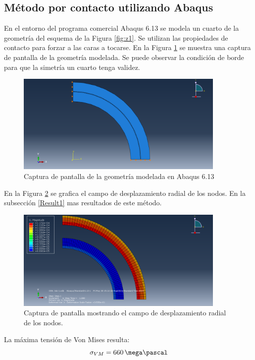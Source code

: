\subsection{M\'etodo por contacto utilizando Abaqus}
En el entorno del programa comercial Abaqus 6.13 se modela un cuarto de la geometr\'ia del esquema de la Figura \ref{fig:z1}. Se utilizan las propiedades de contacto para forzar a las caras a tocarse. En la Figura \ref{fig:zunabaqus} se muestra una captura de pantalla de la geometr\'ia modelada. Se puede observar la condici\'on de borde para que la simetr\'ia un cuarto tenga validez.
\begin{figure}[!ht]
\centering
\includegraphics[width=0.9\textwidth]{zunabaqus.png}
\caption{Captura de pantalla de la geometr\'ia modelada en Abaqus 6.13}
\label{fig:zunabaqus}
\end{figure}
\newpage
En la Figura \ref{fig:zunab2} se grafica el campo de desplazamiento radial de los nodos. En la subsecci\'on \ref{Result1} mas resultados de este m\'etodo.
\begin{figure}[!ht]
\centering
\includegraphics[width=0.9\textwidth]{zunab2.png}
\caption{Captura de pantalla mostrando el campo de desplazamiento radial de los nodos.}
\label{fig:zunab2}
\end{figure}

La m\'axima tensi\'on de Von Mises resulta:
\begin{equation}
\sigma_{VM}=660\,\mega\pascal
\end{equation}

